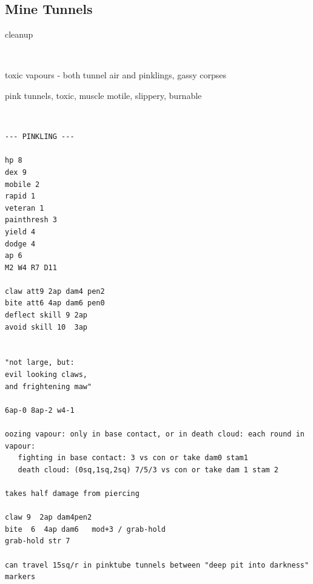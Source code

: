 \goodbreak
{}
\subsection*{Mine Tunnels}
\label{sec:minetunnelstats}

\todo cleanup

\

toxic vapours - both tunnel air and pinklings, gassy corpses

pink tunnels, toxic, muscle motile, slippery,
burnable

\

\begin{samepage}
\small \begin{verbatim}
--- PINKLING ---

hp 8
dex 9
mobile 2
rapid 1
veteran 1
painthresh 3
yield 4
dodge 4
ap 6
M2 W4 R7 D11

claw att9 2ap dam4 pen2
bite att6 4ap dam6 pen0
deflect skill 9 2ap
avoid skill 10  3ap


"not large, but:
evil looking claws,
and frightening maw"

6ap-0 8ap-2 w4-1

oozing vapour: only in base contact, or in death cloud: each round in vapour:
   fighting in base contact: 3 vs con or take dam0 stam1
   death cloud: (0sq,1sq,2sq) 7/5/3 vs con or take dam 1 stam 2

takes half damage from piercing

claw 9  2ap dam4pen2
bite  6  4ap dam6   mod+3 / grab-hold
grab-hold str 7

can travel 15sq/r in pinktube tunnels between "deep pit into darkness" markers
\end{verbatim} \normalsize
\end{samepage}

\

